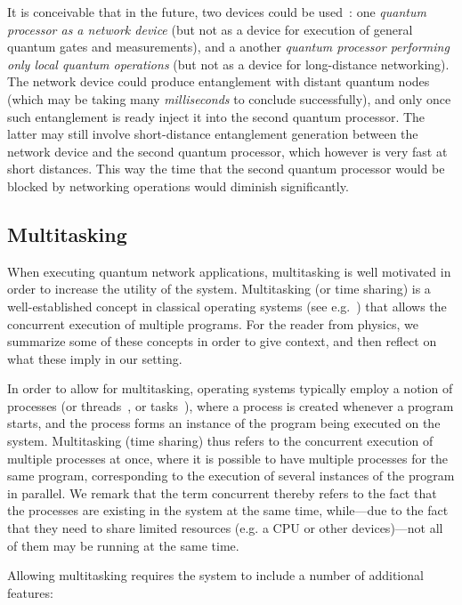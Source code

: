 It is conceivable that in the future, two devices could be used~\cite{vardoyan_2022_netarch}: one \emph{quantum processor as a network device} (but not as a device for execution of general quantum gates and measurements), and a another \emph{quantum processor performing only local quantum operations} (but not as a device for long-distance networking). The network device could produce entanglement with distant quantum nodes (which may be taking many \emph{milliseconds} to conclude successfully), and only once such entanglement is ready inject it into the second quantum processor. The latter may still involve short-distance entanglement generation between the network device and the second quantum processor, which however is very fast at short distances. This way the time that the second quantum processor would be blocked by networking operations would diminish significantly.

\subsection{Multitasking}

When executing quantum network applications, multitasking is well motivated in order to increase the utility of the system. Multitasking (or time sharing) is a well-established concept in classical operating systems (see e.g.~\cite[Section 1.4]{silberschatz_book_2014}) that allows the concurrent execution of multiple programs. For the reader from physics, we summarize some of these concepts in order to give context, and then reflect on what these imply in our setting.

In order to allow for multitasking, operating systems typically employ a notion of processes (or threads~\cite[Chapter 4]{silberschatz_book_2014}, or tasks~\cite[Section 3.1]{silberschatz_book_2014}), where a process is created whenever a program starts, and the process forms an instance of the program being executed on the system. Multitasking (time sharing) thus refers to the concurrent execution of multiple processes at once, where it is possible to have multiple processes for the same program, corresponding to the execution of several instances of the program in parallel. We remark that the term concurrent thereby refers to the fact that the processes are existing in the system at the same time, while---due to the fact that they need to share limited resources (e.g. a \ac{CPU} or other devices)---not all of them may be running at the same time.

Allowing multitasking requires the system to include a number of additional features:

